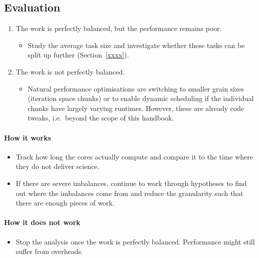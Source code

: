 \subsection{Evaluation}


\begin{enumerate}[noitemsep]
  \item[$\boxtimes$] The work is perfectly balanced, but the performance remains poor.
    \begin{itemize}[noitemsep]
      \item[$\Rightarrow $] Study the average task size and investigate whether these tasks can be split up further (Section~\ref{xxxx}).
    \end{itemize}
  \item[$\boxtimes$] The work is not perfectly balanced.
    \begin{itemize}[noitemsep]
      \item[$\Rightarrow $] 
Natural performance optimisations are switching to smaller grain sizes (iteration space chunks) or to enable dynamic scheduling if the individual chunks have largely varying runtimes.
However, these are already code tweaks, i.e.~beyond the scope of this handbook.
    \end{itemize}
\end{enumerate}




\paragraph*{How it works}

\begin{itemize}[noitemsep]
  \item[$\boxplus$] Track how long the cores actually compute and compare it to the time where they do not deliver science.
  \item[$\boxplus$] If there are severe imbalances, continue to work through hypotheses to find out where the imbalances come from and reduce the granularity such that there are enough pieces of work.
\end{itemize}


\paragraph*{How it does not work}

\begin{itemize}[noitemsep]
  \item[$\boxminus$] Stop the analysis once the work is perfectly balanced. Performance might still suffer from overheads.
\end{itemize}

